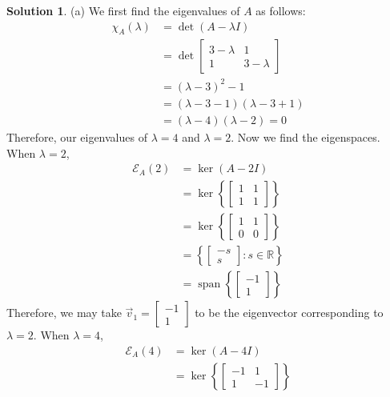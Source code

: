 \documentclass[11pt]{article}
\theoremstyle{definition}\newtheorem{definition}{Definition}
\theoremstyle{definition}\newtheorem{question}{Question}
\theoremstyle{definition}\newtheorem*{solution}{Solution}
\theoremstyle{definition}\newtheorem{example}{Example}
\theoremstyle{definition}\newtheorem{notation}{Notation}
\theoremstyle{theorem}\newtheorem{theorem}{Theorem}
\theoremstyle{theorem}\newtheorem{corollary}{Corollary}
\theoremstyle{theorem}\newtheorem{lemma}{Lemma}
\theoremstyle{theorem}\newtheorem{proposition}{Proposition}
\newcommand{\E}{\mathcal{E}}
\newcommand{\R}{\mathbb{R}}
\DeclareMathOperator{\Span}{span}
\begin{document}
\begin{solution}
    (a) We first find the eigenvalues of $A$ as follows:
    \begin{align*}
        \chi_A(\lambda) &= \det(A - \lambda I) \\
        &= \det\begin{bmatrix} 3 - \lambda & 1 \\ 1 & 3 - \lambda \end{bmatrix} \\
        &= (\lambda - 3)^2 - 1 \\
        &= (\lambda - 3 - 1)(\lambda - 3 + 1) \\
        &= (\lambda - 4)(\lambda - 2) = 0
    \end{align*}
    Therefore, our eigenvalues of $\lambda = 4$ and $\lambda = 2$. Now we find the eigenspaces. When $\lambda = 2$,
    \begin{align*}
        \E_A(2) &= \ker(A - 2I) \\
        &= \ker\left\{\begin{bmatrix} 1 & 1 \\ 1 & 1 \end{bmatrix}\right\} \\
        &= \ker\left\{\begin{bmatrix} 1 & 1 \\ 0 & 0 \end{bmatrix}\right\} \\
        &= \left\{\begin{bmatrix} -s \\ s \end{bmatrix} : s \in \R\right\} \\
        &= \Span\left\{\begin{bmatrix} -1 \\ 1 \end{bmatrix}\right\}
    \end{align*}
    Therefore, we may take $\vec{v}_1 = \begin{bmatrix} -1 \\ 1 \end{bmatrix}$ to be the eigenvector corresponding to $\lambda = 2$. When $\lambda = 4$,
    \begin{align*}
        \E_A(4) &= \ker(A - 4I) \\
        &= \ker\left\{\begin{bmatrix} -1 & 1 \\ 1 & -1 \end{bmatrix}\right\} \\

\end{align*}
\end{solution}
\end{document}
